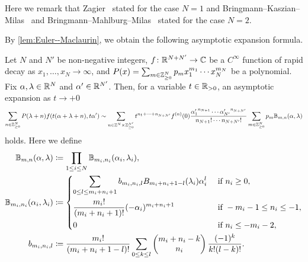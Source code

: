 \documentclass[11pt,a4paper,lualatex]{amsart}
\numberwithin{equation}{section} %
\begin{document}
Here we remark that Zagier~\cite[Equation (44)]{Zagier_asymptotic} stated for the case $ N=1 $ and Bringmann--Kaszian--Milas~\cite[Equation (2.8)]{BKM} and Bringmann--Mahlburg--Milas~\cite[Lemma 2.2]{BMM_high_depth} stated for the case $ N=2 $.

By \cref{lem:Euler--Maclaurin}, we obtain the following asymptotic expansion formula.

\begin{prop} \label{prop:Euler--Maclaurin_poly}
	Let $ N $ and $ N' $ be non-negative integers, $ f \colon \mathbb{R}^{N+N'} \to \mathbb{C} $ be a $ C^\infty $ function of rapid decay as $ x_1, \dots, x_N \to \infty $, and $ P(x) = \sum_{m \in \mathbb{Z}_{\ge 0}^N} p_m x_1^{m_1} \cdots x_N^{m_N} $ be a polynomial.
	Fix $ \alpha, \lambda \in \mathbb{R}^N $ and $ \alpha' \in \mathbb{R}^{N'} $.
	Then, for a variable $ t \in \mathbb{R}_{>0} $, an asymptotic expansion as $ t \to +0 $
	\[
	\sum_{n \in \mathbb{Z}_{\ge 0}^N} P(\lambda + n) f(t(\alpha + \lambda + n), t\alpha')
	\sim \sum_{n \in \mathbb{Z}^N \times \mathbb{Z}_{\ge 0}^{N'}} t^{n_1 + \cdots + n_{N+N'}} f^{(n)}(0) 
	\frac{{\alpha_1'}^{n_{N+1}} \cdots {\alpha_{N'}'}^{n_{N+N'}}}{n_{N+1}! \cdots n_{N+N'}!} 
	\sum_{m \in \mathbb{Z}_{\ge 0}^N} p_m \mathbb{B}_{m, n}(\alpha, \lambda)
	\]
	holds.
	Here we define
	\begin{align}
		\bbB_{m, n}(\alpha, \lambda)
		&\coloneqq
		\prod_{1 \le i \le N} \bbB_{m_i, n_i} (\alpha_i, \lambda_i), \\
		\bbB_{m_i, n_i} (\alpha_i, \lambda_i)
		&\coloneqq
		\begin{dcases}
			\sum_{0 \le l \le m_i + n_i + 1} b_{m_i, n_i, l} B_{m_i + n_i + 1 - l}(\lambda_i) \alpha_i^l & \text{ if } n_i \ge 0, \\
			\frac{m_i!}{(m_i + n_i + 1)!} (-\alpha_i)^{m_i + n_i + 1} & \text{ if } -m_i - 1 \le n_i \le -1, \\
			0 & \text{ if } n_i \le -m_i - 2,
		\end{dcases}
		\\
		b_{m_i, n_i, l} 
		&\coloneqq 
		\frac{m_i!}{(m_i + n_i + 1- l)!} \sum_{0 \le k \le l} \pmat{m_i + n_i - k \\ n_i} \frac{(-1)^k}{k! (l-k)!}.
	\end{align}
\end{prop}
\end{document}
